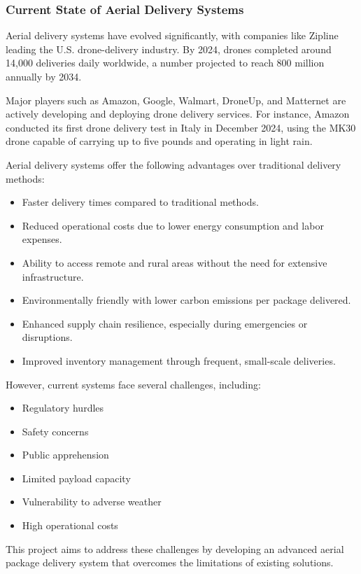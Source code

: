 \documentclass[12pt]{article}
\begin{document}
\subsubsection{Current State of Aerial Delivery Systems}
Aerial delivery systems have evolved significantly, with companies like Zipline leading the U.S. drone-delivery industry. By 2024, drones completed around 14,000 deliveries daily worldwide, a number projected to reach 800 million annually by 2034.

Major players such as Amazon, Google, Walmart, DroneUp, and Matternet are actively developing and deploying drone delivery services. For instance, Amazon conducted its first drone delivery test in Italy in December 2024, using the MK30 drone capable of carrying up to five pounds and operating in light rain.

Aerial delivery systems offer the following advantages over traditional delivery methods:
\begin{itemize}
    \item Faster delivery times compared to traditional methods.
    \item Reduced operational costs due to lower energy consumption and labor expenses.
    \item Ability to access remote and rural areas without the need for extensive infrastructure.
    \item Environmentally friendly with lower carbon emissions per package delivered.
    \item Enhanced supply chain resilience, especially during emergencies or disruptions.
    \item Improved inventory management through frequent, small-scale deliveries.
\end{itemize}

However, current systems face several challenges, including:
\begin{itemize}
    \item Regulatory hurdles
    \item Safety concerns
    \item Public apprehension
    \item Limited payload capacity
    \item Vulnerability to adverse weather
    \item High operational costs
\end{itemize}

This project aims to address these challenges by developing an advanced aerial package delivery system that overcomes the limitations of existing solutions.
\end{document}
